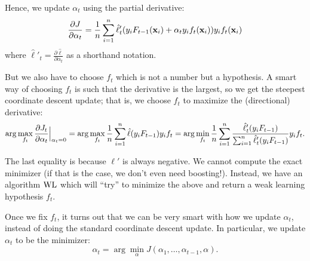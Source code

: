 \documentclass{discussion}
\begin{document}
Hence, we update $\alpha_t$ using the partial derivative:
\[\frac{\partial J}{\partial \alpha_t} = \frac{1}{n} \sum_{i=1}^{n} \hat{\ell}'_t(y_i F_{t-1}(\mathbf{x}_i) + \alpha_t y_i f_t(\mathbf{x}_i)) y_i f_t(\mathbf{x}_i)\]
where $\hat{\ell}'_t = \frac{\partial \hat{\ell}}{\partial \alpha_t}$ as a shorthand notation.


But we also have to choose $f_t$ which is not a number but a hypothesis. A smart way of choosing $f_t$ is such that the derivative is the largest, so we get the steepest coordinate descent update; that is, we choose $f_t$ to maximize the (directional) derivative:
\[\arg\max_{f_t} \frac{\partial J_t}{\partial \alpha_t}\Big|_{\alpha_t = 0} = \arg\max_{f_t} \frac{1}{n} \sum_{i=1}^{n} \hat{\ell}(y_i F_{t-1}) y_i f_t = \arg\min_{f_t} \frac{1}{n} \sum_{i=1}^{n} \frac{\hat{\ell}'_t(y_i F_{t-1})}{\sum_{i=1}^{n}\hat{\ell}_t'(y_i F_{t-1})} y_i f_t.\]

The last equality is because $\ell'$ is always negative. We cannot compute the exact minimizer (if that is the case, we don't even need boosting!). Instead, we have an algorithm $\mathrm{WL}$ which will ``try'' to minimize the above and return a weak learning hypothesis $f_t$.

Once we fix $f_t$, it turns out that we can be very smart with how we update $\alpha_t$, instead of doing the standard coordinate descent update. In particular, we update $\alpha_t$ to be the minimizer:
\[\alpha_t = \arg\min_{\alpha} J(\alpha_{1},\ldots,\alpha_{t-1},\alpha).\]

\end{document}
